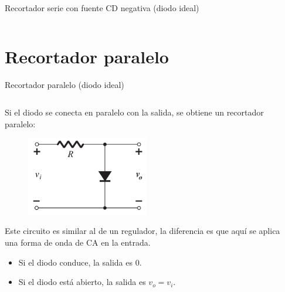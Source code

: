 \documentclass[t,aspectratio=169]{beamer}
\begin{document}
\begin{frame}{Recortador serie con fuente CD negativa (diodo ideal)}
\begin{columns}
\begin{column}{0.5\textwidth}
\end{column}
\end{columns}

\end{frame}


\section{Recortador paralelo}
\begin{frame}{Recortador paralelo (diodo ideal)}

\begin{columns}
\begin{column}{0.5\textwidth}

Si el diodo se conecta en paralelo con la salida, se obtiene un recortador paralelo:

\begin{figure}
    \centering
    \includegraphics[width=0.5\textwidth]{figures/recortador_paralelo_ideal_circuito.png}
\end{figure}

Este circuito es similar al de un regulador, la diferencia es que aquí se aplica una forma de onda de CA en la entrada.

\begin{itemize}
    \item Si el diodo conduce, la salida es 0.
    \item Si el diodo está abierto, la salida es $v_o = v_i$.
\end{itemize}

\end{column}
\begin{column}{0.5\textwidth}


\end{column}
\end{columns}
\end{frame}
\end{document}
